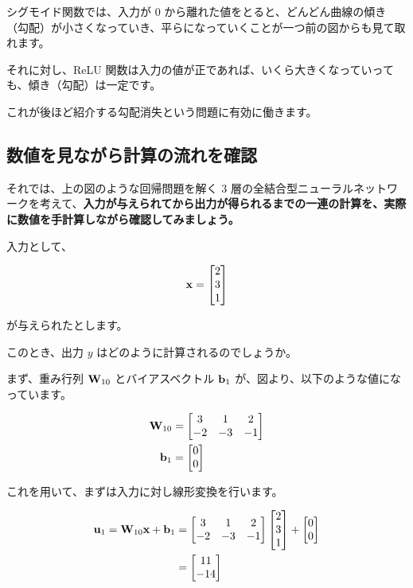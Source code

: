 シグモイド関数では、入力が $0$ から離れた値をとると、どんどん曲線の傾き（勾配）が小さくなっていき、平らになっていくことが一つ前の図からも見て取れます。

それに対し、ReLU 関数は入力の値が正であれば、いくら大きくなっていっても、傾き（勾配）は一定です。

これが後ほど紹介する勾配消失という問題に有効に働きます。


\subsection{数値を見ながら計算の流れを確認}




それでは、上の図のような回帰問題を解く 3 層の全結合型ニューラルネットワークを考えて、\textbf{入力が与えられてから出力が得られるまでの一連の計算を、実際に数値を手計算しながら確認してみましょう。}


入力として、


\[
{\bf x} = \begin{bmatrix}
2 \\
3 \\
1
\end{bmatrix}
\]


が与えられたとします。

このとき、出力 $y$ はどのように計算されるのでしょうか。


まず、重み行列 ${\bf W}_{10}$ とバイアスベクトル ${\bf b}_1$ が、図より、以下のような値になっています。


\begin{align}
{\bf W}_{10} &=
\begin{bmatrix}
3 & 1 & 2 \\
-2 & -3 & -1
\end{bmatrix} \\
{\bf b}_1 &=
\begin{bmatrix}
0 \\
0
\end{bmatrix}
\end{align}


これを用いて、まずは入力に対し線形変換を行います。


\begin{align}
{\bf u}_1 = {\bf W}_{10} {\bf x} + {\bf b}_1
&=
\begin{bmatrix}
3 & 1 & 2 \\
-2 & -3 & -1
\end{bmatrix}
\begin{bmatrix}
2 \\
3 \\
1
\end{bmatrix}
+
\begin{bmatrix}
0 \\
0
\end{bmatrix} \\
&=
\begin{bmatrix}
11 \\
-14
\end{bmatrix}
\end{align}



